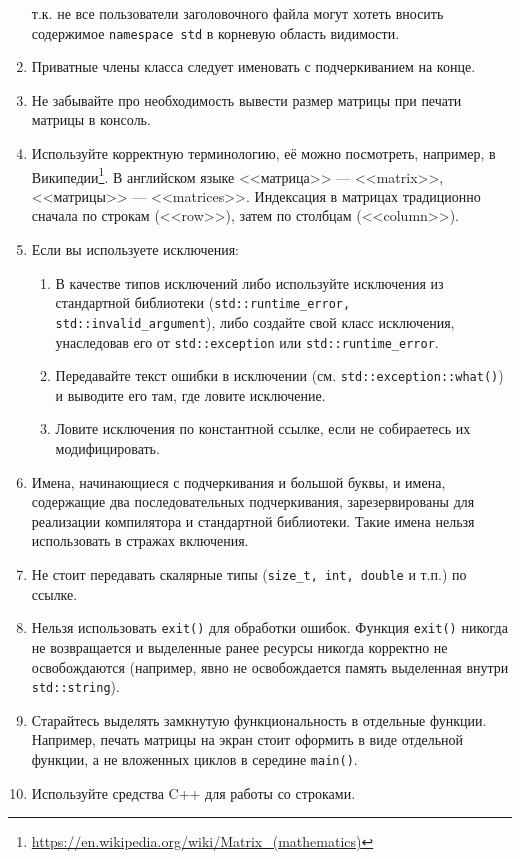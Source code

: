 \documentclass[a4paper,10pt]{article}
\begin{document}
\begin{enumerate}
    т.к. не все пользователи заголовочного файла могут хотеть вносить
    содержимое {\tt namespace std} в корневую область видимости.
    \item Приватные члены класса следует именовать с подчеркиванием на конце.
    \item Не забывайте про необходимость вывести размер матрицы при печати матрицы в консоль.
    \item Используйте корректную терминологию, её можно посмотреть, например,
    в Википедии\footnote{\url{https://en.wikipedia.org/wiki/Matrix_(mathematics)}}.
    В английском языке <<матрица>> --- <<matrix>>, <<матрицы>> --- <<matrices>>.
    Индексация в матрицах традиционно сначала по строкам (<<row>>),
    затем по столбцам (<<column>>).
    \item Если вы используете исключения:
    \begin{enumerate}
        \item В качестве типов исключений либо
        используйте исключения из стандартной библиотеки
        ({\tt std::runtime_error, std::invalid_argument}), либо создайте свой класс
        исключения, унаследовав его от {\tt std::exception} или {\tt std::runtime_error}.
        \item Передавайте текст ошибки в исключении (см. {\tt std::exception::what()}) и
    	выводите его там, где ловите исключение.
    	\item Ловите исключения по константной ссылке, если не собираетесь их модифицировать.
    \end{enumerate}
    \item Имена, начинающиеся с подчеркивания и большой буквы, и имена,
    содержащие два последовательных подчеркивания,
    зарезервированы для реализации компилятора и стандартной библиотеки.
    Такие имена нельзя использовать в стражах включения.
    \item Не стоит передавать скалярные типы ({\tt size_t, int, double} и т.п.) по ссылке.
    \item Нельзя использовать {\tt exit()} для обработки ошибок.
    Функция {\tt exit()} никогда не возвращается и выделенные ранее ресурсы никогда корректно не освобождаются
    (например, явно не освобождается память выделенная внутри {\tt std::string}).
    \item Старайтесь выделять замкнутую функциональность в отдельные функции.
    Например, печать матрицы на экран стоит оформить в виде отдельной функции,
    а не вложенных циклов в середине {\tt main()}.
    \item Используйте средства C++ для работы со строками.

\end{enumerate}
\end{document}
